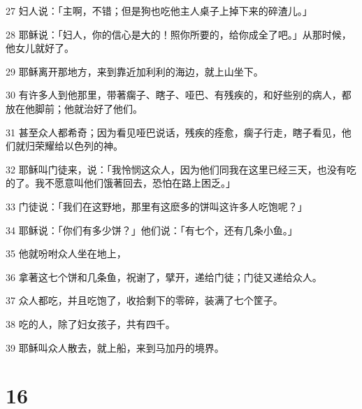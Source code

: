 \par 27 妇人说：「主啊，不错；但是狗也吃他主人桌子上掉下来的碎渣儿。」
\par 28 耶稣说：「妇人，你的信心是大的！照你所要的，给你成全了吧。」从那时候，他女儿就好了。
\par 29 耶稣离开那地方，来到靠近加利利的海边，就上山坐下。
\par 30 有许多人到他那里，带著瘸子、瞎子、哑巴、有残疾的，和好些别的病人，都放在他脚前；他就治好了他们。
\par 31 甚至众人都希奇；因为看见哑巴说话，残疾的痊愈，瘸子行走，瞎子看见，他们就归荣耀给以色列的神。
\par 32 耶稣叫门徒来，说：「我怜悯这众人，因为他们同我在这里已经三天，也没有吃的了。我不愿意叫他们饿著回去，恐怕在路上困乏。」
\par 33 门徒说：「我们在这野地，那里有这麽多的饼叫这许多人吃饱呢？」
\par 34 耶稣说：「你们有多少饼？」他们说：「有七个，还有几条小鱼。」
\par 35 他就吩咐众人坐在地上，
\par 36 拿著这七个饼和几条鱼，祝谢了，擘开，递给门徒；门徒又递给众人。
\par 37 众人都吃，并且吃饱了，收拾剩下的零碎，装满了七个筐子。
\par 38 吃的人，除了妇女孩子，共有四千。
\par 39 耶稣叫众人散去，就上船，来到马加丹的境界。

\chapter{16}

